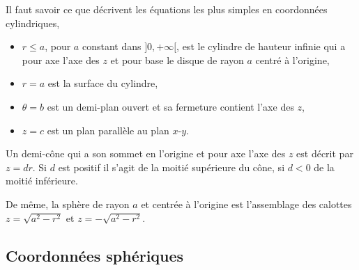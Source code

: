 \begin{example}
Il faut savoir ce que décrivent les équations les plus simples en coordonnées cylindriques,
\begin{itemize}
\item $r\leq a$, pour $a$ constant dans  $]0, +\infty[$, est le cylindre de hauteur infinie qui a pour axe l'axe des $z$ et pour base le disque de rayon $a$ centré à l'origine,
\item $r= a$ est  la surface du cylindre,
\item $\theta = b$ est un demi-plan ouvert et sa fermeture contient l'axe des $z$,
\item $z=c$ est un plan parallèle au plan $x$-$y$.
\end{itemize}
\end{example}

\begin{example}
  Un demi-cône qui a  son sommet en l'origine et  pour axe l'axe des $z$ est décrit par $z=d r$.  Si $d$ est positif  il s'agit  de la moitié supérieure du cône, si $d<0$ de la moitié inférieure.
\end{example}

\begin{example}
 De même,  la sphère de rayon $a$ et centrée à l'origine est l'assemblage des calottes $z=\sqrt{a^2-r^2}$ et $z=-\sqrt{a^2-r^2}$.
\end{example}



\subsection{Coordonnées sphériques}

